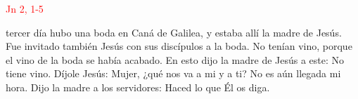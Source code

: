 \hfill\textcolor{red}{Jn 2, 1-5}

tercer día hubo una boda en Caná de Galilea, y estaba allí la madre de Jesús. Fue invitado también Jesús con sus discípulos a la boda.
No tenían vino, porque el vino de la boda se había acabado. En esto dijo la madre de Jesús a este: No tiene vino. Díjole Jesús: Mujer,
¿qué nos va a mi y a ti? No es aún llegada mi hora. Dijo la madre a los servidores: Haced lo que Él os diga. 